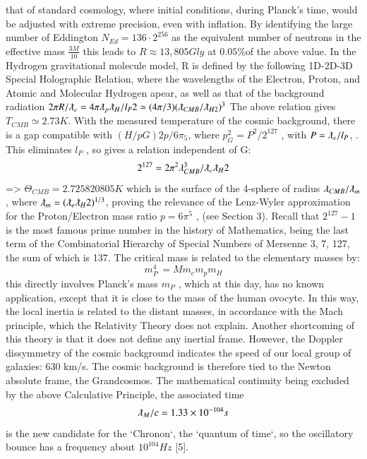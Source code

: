 \documentclass[twoside,draft]{article}
\begin{document}
\begin{sloppypar}
{that of standard cosmology, where initial conditions, during Planck's time, would be adjusted with
extreme precision, even with inflation. By identifying the large number of Eddington $N_{Ed} = 136 \cdot
2^{256}$ as the equivalent number of neutrons in the effective mass $\frac{3M}{10}$ this leads to $R \approx 13,805
Gly$ at $0.05\%$of the above value.
In the Hydrogen gravitational molecule model, R is defined by the following 1D-2D-3D Special
Holographic Relation, where the wavelengths of the Electron, Proton, and Atomic and Molecular
Hydrogen apear, as well as that of the background radiation
$2 \pi R/\lambdabar_{e} = 4 \pi \lambdabar_{p} \lambdabar_{H} /l_{P} 2 \simeq (4\pi/3)(\lambdabar_{CMB} /\lambdabar_{H2})^{3}$
The above relation gives $T_{CMB} \simeq 2.73 K$. With the measured temperature of the cosmic
background, there is a gap compatible with $(H/p G ) 2 p/6\pi_{5} $, where $p_{G}^{2} = P^{2} /2^{127}$ , with $P = \lambdabar_{e} /l_{P}$, . 
This eliminates $l_{P}$ , so gives a relation independent of G:
$$2^{127} = 2\pi^{2} \lambda_{CMB}^{3} /\lambdabar_{e} \lambdabar_{H} 2$$
=> $\Theta_{CMB} = 2.725820805 K$ which is the surface of the 4-sphere of radius $\lambda_{CMB} / \lambdabar_{m}$, where $\lambdabar_{m} = (\lambdabar_{e} \lambdabar_{H} 2 )^{1/3} $, proving the relevance of
the Lenz-Wyler approximation for the Proton/Electron mass ratio $p = 6\pi^{5}$ , (see Section 3). Recall
that $2^{127} - 1$ is the most famous prime number in the history of Mathematics, being the last term of
the Combinatorial Hierarchy of Special Numbers of Mersenne 3, 7, 127, the sum of which is 137.
The critical mass is related to the elementary masses by:
\begin{equation}
m_{P}^{4}\, = M m_{e} m_{p} m_{H}
\end{equation}
this directly involves Planck's mass $m_{P}$ , which at this day, has no known application, except
that it is close to the mass of the human ovocyte. In this way, the local inertia is related to the distant
masses, in accordance with the Mach principle, which the Relativity Theory does not explain.
Another shortcoming of this theory is that it does not define any inertial frame. However, the
Doppler dissymmetry of the cosmic background indicates the speed of our local group of galaxies:
630 km/s. The cosmic background is therefore tied to the Newton absolute frame, the Grandcosmos.
The mathematical continuity being excluded by the above Calculative Principle, the associated
time 
\begin{equation}
\lambdabar_{M} /c = 1.33 \times 10^{-104}s
\end{equation}
is the new candidate for the `Chronon`, the `quantum of time`, so the
oscillatory bounce has a frequency about $10^{104}Hz$ \cite{fm2}[5].

}
\end{sloppypar}
\end{document}
